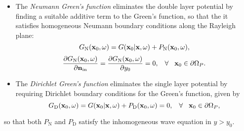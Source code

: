 \begin{itemize}
\item The \emph{Neumann Green's function} eliminates the double layer potential by finding a suitable additive term to the Green's function, so that the it satisfies homogeneous Neumann boundary conditions along the Rayleigh plane:
\begin{equation}
G_{\mathrm{N}}(\mathbf{x}_0,\omega) = G(\mathbf{x}_0|\mathbf{x},\omega) + P_{\mathrm{N}}(\mathbf{x}_0,\omega),
\end{equation}
\begin{equation}
\frac{\partial G_{\mathrm{N}}(\mathbf{x}_0,\omega) }{\partial \mathbf{n}_{\mathrm{in}}} = \frac{\partial G_{\mathrm{N}}(\mathbf{x}_0,\omega) }{\partial y_0} = 0, \hspace{3mm} \forall \hspace{3mm} \mathbf{x}_0 \in \partial \Omega_P.
\label{Eq:Theory:Neumann_Greenfun_def}
\end{equation}
\item The \emph{Dirichlet Green's function} eliminates the single layer potential by requiring Dirichlet boundary conditions for the Green's function, given by
%
\begin{equation}
G_\mathrm{D}(\mathbf{x}_0,\omega) = G(\mathbf{x}_0|\mathbf{x},\omega) + P_{\mathrm{D}}(\mathbf{x}_0,\omega) = 0, \hspace{3mm} \forall \hspace{3mm} \mathbf{x}_0 \in \partial \Omega_P,
\label{Eq:Theory:Dirichlet_Greenfun_def}
\end{equation}
%
\end{itemize}
so that both $P_{\mathrm{N}}$ and $P_{\mathrm{D}}$ satisfy the inhomogeneous wave equation in $y > y_0$.

